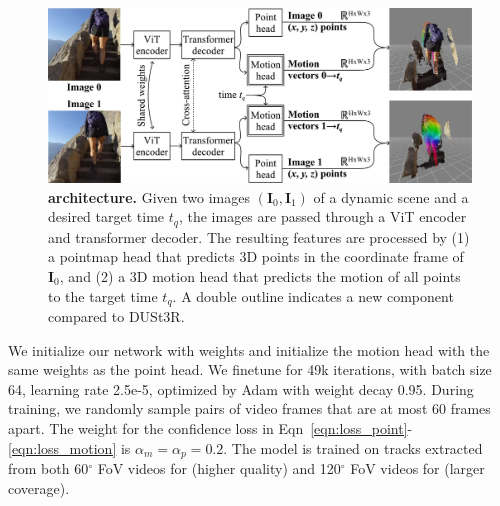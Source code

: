  
\begin{figure}[t]
    \centering
    \includegraphics[width=\linewidth]{fig/method-HgkMYtMSdW4-clip8.pdf}
    \caption{\textbf{\method architecture.} Given two images $(\mathbf{I}_0, \mathbf{I}_1)$ of a dynamic scene and a desired target time $t_q$, the images are passed through a ViT encoder and transformer decoder. The resulting features are processed by (1) a pointmap head that predicts 3D points in the coordinate frame of $\mathbf{I}_0$, and (2) a 3D motion head that predicts the motion of all points to the target time $t_q$. A double outline indicates a new component compared to DUSt3R.}
    \label{fig:method}
\end{figure}

We initialize our network with \duster weights and initialize the motion head with the same weights as the point head. We finetune for 49k iterations, with batch size 64, learning rate 2.5e-5, optimized by Adam with weight decay 0.95. During training, we randomly sample pairs of video frames that are at most 60 frames apart. 
The weight for the confidence loss in Eqn~\ref{eqn:loss_point}-\ref{eqn:loss_motion} is $\alpha_m = \alpha_p = 0.2$. The model is trained on tracks extracted from both 60$^\circ$ FoV videos for (higher quality) and 120$^\circ$ FoV videos for (larger coverage). 
